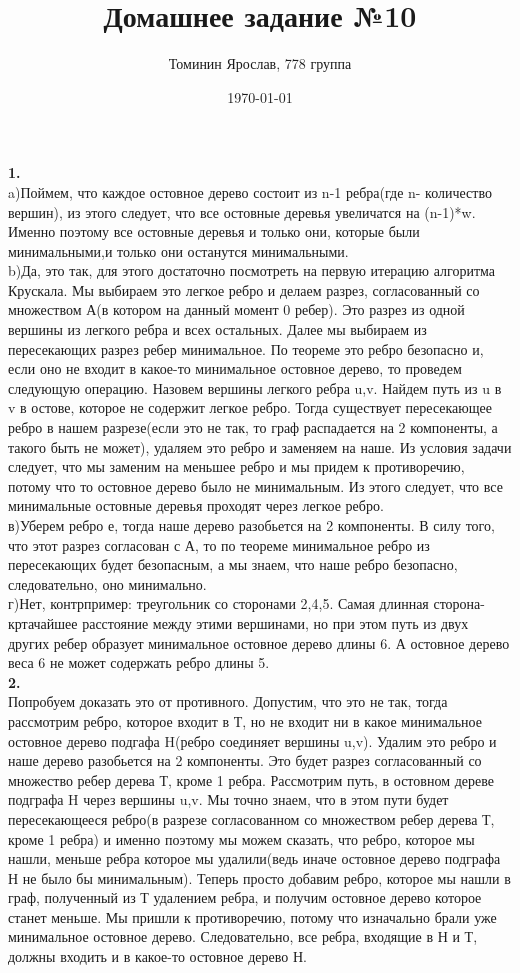 \documentclass[a4paper,12pt]{article}
\author{Томинин Ярослав, 778 группа}
\title{Домашнее задание №10}
\date{\today}
\begin{document}
 

\maketitle
\newpage
\textbf{1.}\\
a)Поймем, что каждое остовное дерево состоит из n-1 ребра(где n- количество вершин), из этого следует, что все остовные деревья увеличатся на (n-1)*w. Именно поэтому все остовные деревья и только они, которые были минимальными,и только они останутся минимальными.\\
b)Да, это так, для этого  достаточно посмотреть на первую итерацию алгоритма Крускала. Мы выбираем это легкое ребро и  делаем разрез, согласованный со множеством А(в котором на данный момент 0 ребер). Это разрез из одной вершины из легкого ребра и всех остальных. Далее мы выбираем из пересекающих разрез ребер минимальное. По теореме это ребро безопасно и, если оно не входит в какое-то минимальное остовное дерево, то проведем следующую операцию. Назовем вершины легкого ребра u,v. Найдем путь из u в v в остове, которое не содержит легкое ребро. Тогда существует пересекающее ребро в нашем разрезе(если это не так, то граф распадается на 2 компоненты, а такого быть не может), удаляем это ребро и заменяем на наше. Из условия задачи следует, что мы заменим на меньшее ребро и мы придем к противоречию, потому что то остовное дерево было не минимальным. Из этого следует, что все минимальные остовные деревья проходят через легкое ребро.\\
в)Уберем ребро е, тогда наше дерево разобьется на 2 компоненты. В силу того, что этот разрез согласован с А, то по теореме минимальное ребро из пересекающих будет безопасным, а мы знаем, что наше ребро безопасно, следовательно, оно минимально.\\
г)Нет, контрпример: треугольник со сторонами 2,4,5. Самая длинная сторона- кртачайшее расстояние между этими вершинами, но при этом путь из двух других ребер образует минимальное  остовное дерево длины 6. А остовное дерево веса 6 не может содержать ребро длины 5.\\
\textbf{2.}\\
Попробуем доказать это от противного. Допустим, что это не так, тогда рассмотрим ребро, которое входит в Т, но не входит ни в какое минимальное остовное дерево подгафа H(ребро соединяет вершины u,v). Удалим это ребро и наше дерево разобьется на 2 компоненты. Это будет разрез согласованный со множество ребер дерева Т, кроме 1 ребра. Рассмотрим путь, в остовном дереве подграфа H через вершины u,v. Мы точно знаем, что в этом пути будет пересекающееся ребро(в разрезе согласованном со множеством ребер дерева Т, кроме 1 ребра) и именно поэтому мы можем сказать, что ребро, которое мы нашли, меньше ребра которое мы удалили(ведь иначе остовное дерево подграфа Н не было бы минимальным). Теперь просто добавим ребро, которое мы нашли в граф, полученный из Т удалением ребра, и получим остовное дерево которое станет меньше. Мы пришли к противоречию, потому что изначально брали уже минимальное остовное дерево. Следовательно, все ребра, входящие в Н и Т, должны входить и в какое-то остовное дерево Н.\\
\end{document}
